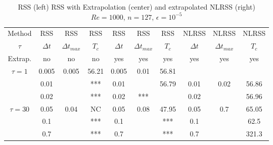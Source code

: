 \documentclass[hyperref={pdfpagemode=FullScreen},9pt]{beamer}
\begin{document}
\begin{frame}
{\small 
\begin{table}[h!]
\begin{center}
\begin{tabular}{|c||c|c|c||c|c|c||c|c|c|}
\hline
Method & RSS & RSS & RSS & RSS & RSS & RSS & NLRSS & NLRSS & NLRSS\\
$\tau$ & $\Delta t$ & $\Delta t_{max}$ & $T_c$ & $\Delta t$ & $\Delta t_{max}$ & $T_c$&$\Delta t$ & $\Delta t_{max}$ & $T_c$\\
Extrap. & no  & no  & no  & yes& yes& yes &yes& yes& yes\\
\hline 
\hline 
$\tau = 1$ & 0.005 & 0.005 & 56.21& 0.005 & 0.01 & 56.81 & & &  \\ 
\hline
                  &  0.01       &        &   ***  &     0.01      &       &   56.79  & 0.01 & 0.02 & 56.86 \\ 
                  &  0.02       &        &   ***  &     0.02      & ***       &    & 0.02 &   & 56.96 \\ 
\hline 
\hline  
$\tau = 30$     &0.05 &0.04 & NC  &       0.05&0.08&47.95&  0.05 & 0.7 & 65.05 \\ 
\hline
                     & 0.1   &      &***&  0.1&&***&0.1 &   & 62.5 \\ 
\hline
                     & 0.7   &      &*** &0.7   &&*** &  0.7 &   & 321.3 \\ 
\hline 
\end{tabular}
\caption{RSS (left)   RSS with   Extrapolation (center) and extrapolated NLRSS  (right) $Re=1000$, $n=127$, $\epsilon=10^{-5}$}
\label{tab6}
\end{center}
\end{table}
}
\end{frame}
\end{document}
